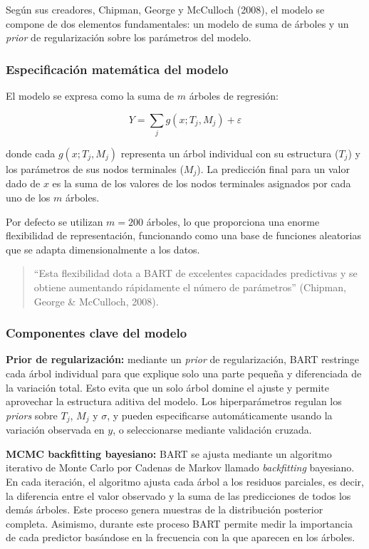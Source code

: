 ﻿\documentclass[11pt,a4paper]{article}
\begin{document}
Según sus creadores, Chipman, George y McCulloch (2008), el modelo se compone de dos elementos fundamentales: un modelo de suma de árboles y un \textit{prior} de regularización sobre los parámetros del modelo.

\subsubsection{Especificación matemática del modelo}

El modelo se expresa como la suma de $m$ árboles de regresión:

\[
Y=\sum_j g(x;T_j,M_j)+\varepsilon
\]

donde cada $g(x;T_j,M_j)$ representa un árbol individual con su estructura ($T_j$) y los parámetros de sus nodos terminales ($M_j$). La predicción final para un valor dado de $x$ es la suma de los valores de los nodos terminales asignados por cada uno de los $m$ árboles.

Por defecto se utilizan $m=200$ árboles, lo que proporciona una enorme flexibilidad de representación, funcionando como una base de funciones aleatorias que se adapta dimensionalmente a los datos.

\begin{quote}
“Esta flexibilidad dota a BART de excelentes capacidades predictivas y se obtiene aumentando rápidamente el número de parámetros” (Chipman, George \& McCulloch, 2008).
\end{quote}

\subsubsection{Componentes clave del modelo}

\textbf{Prior de regularización:} mediante un \textit{prior} de regularización, BART restringe cada árbol individual para que explique solo una parte pequeña y diferenciada de la variación total. Esto evita que un solo árbol domine el ajuste y permite aprovechar la estructura aditiva del modelo. Los hiperparámetros regulan los \textit{priors} sobre $T_j$, $M_j$ y $\sigma$, y pueden especificarse automáticamente usando la variación observada en $y$, o seleccionarse mediante validación cruzada.

\vspace{0.2cm}

\textbf{MCMC backfitting bayesiano:} BART se ajusta mediante un algoritmo iterativo de Monte Carlo por Cadenas de Markov llamado \textit{backfitting} bayesiano. En cada iteración, el algoritmo ajusta cada árbol a los residuos parciales, es decir, la diferencia entre el valor observado y la suma de las predicciones de todos los demás árboles. Este proceso genera muestras de la distribución posterior completa. Asimismo, durante este proceso BART permite medir la importancia de cada predictor basándose en la frecuencia con la que aparecen en los árboles.
\end{document}
